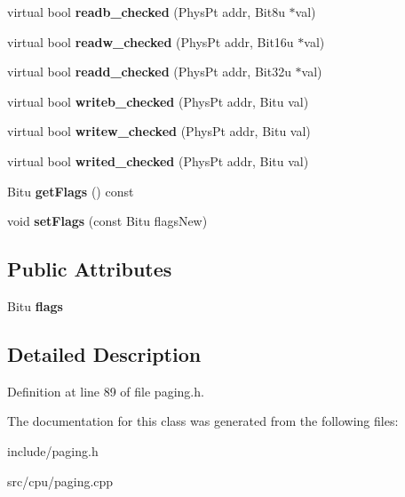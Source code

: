 \begin{DoxyCompactItemize}
\item 
\hypertarget{classPageHandler_ae3dcf8d33fef258d08637cb0baf51a3d}{virtual bool {\bfseries readb\-\_\-checked} (Phys\-Pt addr, Bit8u $\ast$val)}\label{classPageHandler_ae3dcf8d33fef258d08637cb0baf51a3d}

\item 
\hypertarget{classPageHandler_a69bd6b5dd4e6c86211129df23045711a}{virtual bool {\bfseries readw\-\_\-checked} (Phys\-Pt addr, Bit16u $\ast$val)}\label{classPageHandler_a69bd6b5dd4e6c86211129df23045711a}

\item 
\hypertarget{classPageHandler_a8f2c1c323c5159348031ae6d7ca11718}{virtual bool {\bfseries readd\-\_\-checked} (Phys\-Pt addr, Bit32u $\ast$val)}\label{classPageHandler_a8f2c1c323c5159348031ae6d7ca11718}

\item 
\hypertarget{classPageHandler_a2e43caf55e0f752d080ef1e723533e8e}{virtual bool {\bfseries writeb\-\_\-checked} (Phys\-Pt addr, Bitu val)}\label{classPageHandler_a2e43caf55e0f752d080ef1e723533e8e}

\item 
\hypertarget{classPageHandler_a62c89d9498bbaa9e962d02f3ebdbbf64}{virtual bool {\bfseries writew\-\_\-checked} (Phys\-Pt addr, Bitu val)}\label{classPageHandler_a62c89d9498bbaa9e962d02f3ebdbbf64}

\item 
\hypertarget{classPageHandler_aab88a929a0647d9923ab75aaf62ce633}{virtual bool {\bfseries writed\-\_\-checked} (Phys\-Pt addr, Bitu val)}\label{classPageHandler_aab88a929a0647d9923ab75aaf62ce633}

\item 
\hypertarget{classPageHandler_a4ee12ff292c0c883d875ba67171f69b5}{Bitu {\bfseries get\-Flags} () const }\label{classPageHandler_a4ee12ff292c0c883d875ba67171f69b5}

\item 
\hypertarget{classPageHandler_a0280fa6d07a05a333ae3d58561389b9d}{void {\bfseries set\-Flags} (const Bitu flags\-New)}\label{classPageHandler_a0280fa6d07a05a333ae3d58561389b9d}

\end{DoxyCompactItemize}
\subsection*{Public Attributes}
\begin{DoxyCompactItemize}
\item 
\hypertarget{classPageHandler_afdba8b3717029016c4b530339a2440d3}{Bitu {\bfseries flags}}\label{classPageHandler_afdba8b3717029016c4b530339a2440d3}

\end{DoxyCompactItemize}


\subsection{Detailed Description}


Definition at line 89 of file paging.\-h.



The documentation for this class was generated from the following files\-:\begin{DoxyCompactItemize}
\item 
include/paging.\-h\item 
src/cpu/paging.\-cpp\end{DoxyCompactItemize}
